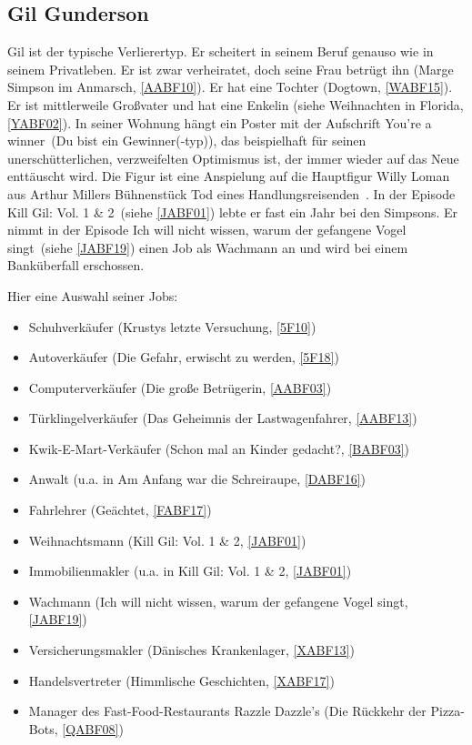 {\subsection{Gil Gunderson}\label{GilGunderson}
Gil ist der typische Verlierertyp. Er scheitert in seinem Beruf genauso wie in seinem Privatleben. Er ist zwar verheiratet, doch seine Frau betrügt ihn (\glqq Marge Simpson im Anmarsch\grqq, \ref{AABF10}). Er hat eine Tochter (\glqq Dogtown\grqq, \ref{WABF15}). Er ist mittlerweile Großvater und hat eine Enkelin (siehe \glqq Weihnachten in Florida\grqq, \ref{YABF02}). In seiner Wohnung hängt ein Poster mit der Aufschrift \glqq You're a winner\grqq\ (\glqq Du bist ein Gewinner(-typ)\grqq ), das beispielhaft für seinen unerschütterlichen, verzweifelten Optimismus ist, der immer wieder auf das Neue enttäuscht wird. Die Figur ist eine Anspielung auf die Hauptfigur Willy Loman aus Arthur Millers Bühnenstück \glqq Tod eines Handlungsreisenden\grqq\ \cite{Wikipedia}. In der Episode \glqq Kill Gil: Vol. 1 \& 2\grqq\ (siehe \ref{JABF01}) lebte er fast ein Jahr bei den Simpsons. Er nimmt in der Episode \glqq Ich will nicht wissen, warum der gefangene Vogel singt\grqq\ (siehe \ref{JABF19}) einen Job als Wachmann an und wird bei einem Banküberfall erschossen.

Hier eine Auswahl seiner Jobs:
\begin{itemize}
 	\item Schuhverkäufer (\glqq Krustys letzte Versuchung\grqq , \ref{5F10})
	\item Autoverkäufer (\glqq Die Gefahr, erwischt zu werden\grqq , \ref{5F18})
	\item Computerverkäufer (\glqq Die große Betrügerin\grqq , \ref{AABF03})
	\item Türklingelverkäufer (\glqq Das Geheimnis der Lastwagenfahrer\grqq , \ref{AABF13})
	\item Kwik-E-Mart-Verkäufer (\glqq Schon mal an Kinder gedacht?\grqq , \ref{BABF03})
	\item Anwalt (u.a. in \glqq Am Anfang war die Schreiraupe\grqq , \ref{DABF16})
	\item Fahrlehrer (\glqq Geächtet\grqq , \ref{FABF17})
	\item Weihnachtsmann (\glqq Kill Gil: Vol. 1 \& 2\grqq, \ref{JABF01})
	\item Immobilienmakler (u.a. in \glqq Kill Gil: Vol. 1 \& 2\grqq, \ref{JABF01})
	\item Wachmann (\glqq Ich will nicht wissen, warum der gefangene Vogel singt\grqq , \ref{JABF19})
	\item Versicherungsmakler (\glqq Dänisches Krankenlager\grqq, \ref{XABF13})
	\item Handelsvertreter (\glqq Himmlische Geschichten\grqq, \ref{XABF17})
	\item Manager des Fast-Food-Restaurants Razzle Dazzle's (\glqq Die Rückkehr der Pizza-Bots\grqq, \ref{QABF08})
\end{itemize}


}
